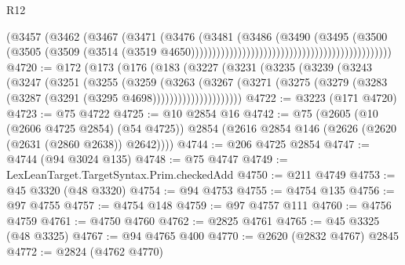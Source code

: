 \begin{lexlean}{R12}
\begin{coremodule}
                                                                      (@3457
                                                                        (@3462
                                                                          (@3467
                                                                            (@3471
                                                                              (@3476
                                                                                (@3481
                                                                                  (@3486
                                                                                    (@3490
                                                                                      (@3495
                                                                                        (@3500
                                                                                          (@3505
                                                                                            (@3509
                                                                                              (@3514
                                                                                                (@3519
                                                                                                  @4650)))))))))))))))))))))))))))))))))))))))))))))))
@4720 := @172
    (@173
      (@176
        (@183
          (@3227
            (@3231
              (@3235
                (@3239
                  (@3243
                    (@3247
                      (@3251
                        (@3255
                          (@3259
                            (@3263
                              (@3267
                                (@3271
                                  (@3275
                                    (@3279 (@3283 (@3287 (@3291 (@3295 @4698)))))))))))))))))))))
@4722 := @3223 (@171 @4720)
@4723 := @75 @4722
@4725 := @10 @2854 @16
@4742 := @75
    (@2605
      (@10 (@2606 @4725 @2854) (@54 @4725))
      @2854
      (@2616 @2854 @146 (@2626 (@2620 (@2631 (@2860 @2638)) @2642))))
@4744 := @206 @4725 @2854
@4747 := @4744 (@94 @3024 @135)
@4748 := @75 @4747
@4749 := LexLeanTarget.TargetSyntax.Prim.checkedAdd
@4750 := @211 @4749
@4753 := @45 @3320 (@48 @3320)
@4754 := @94 @4753
@4755 := @4754 @135
@4756 := @97 @4755
@4757 := @4754 @148
@4759 := @97 @4757 @111
@4760 := @4756 @4759
@4761 := @4750 @4760
@4762 := @2825 @4761
@4765 := @45 @3325 (@48 @3325)
@4767 := @94 @4765 @400
@4770 := @2620 (@2832 @4767) @2845
@4772 := @2824 (@4762 @4770)

\end{coremodule}
\end{lexlean}

